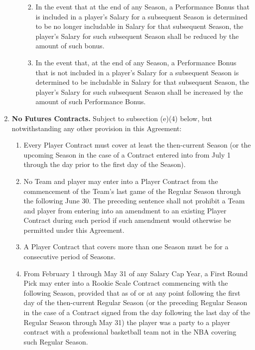 \documentclass[
]{book}
\providecommand{\tightlist}{%
  \setlength{\itemsep}{0pt}\setlength{\parskip}{0pt}}
\begin{document}
\begin{enumerate}
\begin{enumerate}
    \begin{enumerate}
    \def\labelenumiii{(\roman{enumiii})}
    \tightlist
    \item
      In the event that at the end of any Season, a Performance Bonus that is included in a player's Salary for a subsequent Season is determined to be no longer includable in Salary for that subsequent Season, the player's Salary for such subsequent Season shall be reduced by the amount of such bonus.
    \item
      In the event that, at the end of any Season, a Performance Bonus that is not included in a player's Salary for a subsequent Season is determined to be includable in Salary for that subsequent Season, the player's Salary for such subsequent Season shall be increased by the amount of such Performance Bonus.
    \end{enumerate}
  \end{enumerate}
\item
  \textbf{No Futures Contracts.} Subject to subsection (e)(4) below, but notwithstanding any other provision in this Agreement:

  \begin{enumerate}
  \def\labelenumii{(\arabic{enumii})}
  \tightlist
  \item
    Every Player Contract must cover at least the then-current Season (or the upcoming Season in the case of a Contract entered into from July 1 through the day prior to the first day of the Season).
  \item
    No Team and player may enter into a Player Contract from the commencement of the Team's last game of the Regular Season through the following June 30. The preceding sentence shall not prohibit a Team and player from entering into an amendment to an existing Player Contract during such period if such amendment would otherwise be permitted under this Agreement.
  \item
    A Player Contract that covers more than one Season must be for a consecutive period of Seasons.
  \item
    From February 1 through May 31 of any Salary Cap Year, a First Round Pick may enter into a Rookie Scale Contract commencing with the following Season, provided that as of or at any point following the first day of the then-current Regular Season (or the preceding Regular Season in the case of a Contract signed from the day following the last day of the Regular Season through May 31) the player was a party to a player contract with a professional basketball team not in the NBA covering such Regular Season.
  \end{enumerate}
\end{enumerate}
\end{document}
